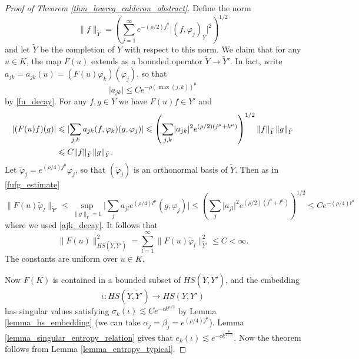 \documentclass[12pt,twoside]{amsart}
\numberwithin{equation}{section}
\renewcommand{\leq}{\leqslant}
\newcommand{\abs}[1]{\lvert #1 \rvert}          %
\newcommand{\norm}[1]{\lVert #1 \rVert}         %
\begin{document}
\begin{proof}[Proof of Theorem \ref{thm_lowreg_calderon_abstract}]
Define the norm 
\[
\norm{f}_{\tilde{Y}} = \left( \sum_{j=1}^{\infty} e^{-(\rho/2) j^{\mu}} \abs{(f, \varphi_j)_Y}^2 \right)^{1/2}
\]
and let $\tilde{Y}$ be the completion of $Y$ with respect to this norm. We claim that for any $u \in K$, the map $F(u)$ extends as a bounded operator $\tilde{Y} \to \tilde{Y}'$. In fact, write $a_{jk} = a_{jk}(u) = (F(u) \varphi_k)(\varphi_j)$, so that 
\begin{equation} \label{ajk_decay}
\abs{a_{jk}} \leq C e^{-\rho (\max(j,k))^{\mu}}
\end{equation}
by \eqref{fu_decay}. For any $f, g \in Y$ we have $F(u)f \in Y'$ and 
\begin{align}
\abs{(F(u)f)(g)} &\leq \abs{\sum_{j,k} a_{jk} (f, \varphi_k) (g, \varphi_j)} \leq \left( \sum_{j,k} \abs{a_{jk}}^2 e^{(\rho/2)(j^{\mu} + k^{\mu})} \right)^{1/2} \norm{f}_{\tilde{Y}} \norm{g}_{\tilde{Y}} \notag \\
 &\leq C \norm{f}_{\tilde{Y}} \norm{g}_{\tilde{Y}}. \label{fufg_estimate}
\end{align}
Let $\tilde{\varphi}_j = e^{(\rho/4) j^{\mu}} \varphi_j$, so that $(\tilde{\varphi}_j)$ is an orthonormal basis of $\tilde{Y}$. Then as in \eqref{fufg_estimate} 
\[
\norm{F(u)\tilde{\varphi}_l}_{\tilde{Y}'} \leq \sup_{\norm{g}_{\tilde{Y}} = 1} \abs{\sum_j a_{jl} e^{(\rho/4) l^{\mu}}(g, \varphi_j)} \leq \left( \sum_{j} \abs{a_{jl}}^2 e^{(\rho/2)(j^{\mu} + l^{\mu})} \right)^{1/2} \leq C e^{-(\rho/4) l^{\mu}}
\]
where we used \eqref{ajk_decay}. It follows that 
\[
\norm{F(u)}_{HS(\tilde{Y}, \tilde{Y}')}^2 = \sum_{l=1}^{\infty} \norm{F(u) \tilde{\varphi}_l}_{\tilde{Y}'}^2 \leq C < \infty.
\]
The constants are uniform over $u \in K$.

Now $F(K)$ is contained in a bounded subset of $HS(\tilde{Y}, \tilde{Y}')$, and the embedding $$\iota: HS(\tilde{Y}, \tilde{Y}') \to HS(Y, Y')$$ has singular values satisfying $\sigma_k(\iota) \lesssim C e^{-c k^{\mu/2}}$ by Lemma \ref{lemma_hs_embedding} (we can take $\alpha_j = \beta_j = e^{(\rho/4) j^{\mu}}$). Lemma \ref{lemma_singular_entropy_relation} gives that $e_k(\iota) \lesssim e^{-c k^{\frac{\mu}{2+\mu}}}$. Now the theorem follows from Lemma \ref{lemma_entropy_typical}.
\end{proof}
\end{document}
